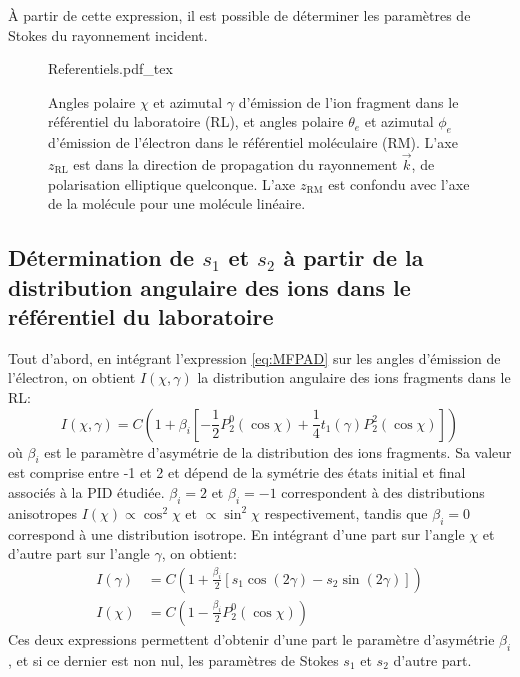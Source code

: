 \`{A} partir de cette expression, il est possible de déterminer les paramètres de Stokes du rayonnement incident.

\begin{figure}
\centering
\def\svgwidth{0.5\textwidth}
{Referentiels.pdf_tex}
\caption{Angles polaire $\chi$ et azimutal $\gamma$ d'émission de l'ion fragment dans le référentiel du laboratoire (RL), et angles polaire $\theta_e$ et azimutal $\phi_e$ d'émission de l'électron dans le référentiel moléculaire (RM). L'axe $z_{\text{RL}}$ est dans la direction de propagation du rayonnement $\vec{k}$, de polarisation elliptique quelconque. L'axe $z_{\text{RM}}$ est confondu avec l'axe de la molécule pour une molécule linéaire.}
\label{fig:Referentiels}
\end{figure}

\subsection{Détermination de $s_1$ et $s_2$ à partir de la distribution angulaire des ions dans le référentiel du laboratoire}
Tout d'abord, en intégrant l'expression \ref{eq:MFPAD} sur les angles d'émission de l'électron, on obtient $I(\chi, \gamma)$ la distribution angulaire des ions fragments dans le RL:
\begin{equation}
I(\chi, \gamma) = C \left( 1 + \beta_i \left[ - \frac{1}{2} P_2^0(\cos \chi) + \frac{1}{4} t_1(\gamma) P_2^2(\cos \chi) \right] \right)
\end{equation}
où $\beta_i$ est le paramètre d'asymétrie de la distribution des ions fragments. Sa valeur est comprise entre -1 et 2 et dépend de la symétrie des états initial et final associés à la PID étudiée. $\beta_i =2$ et $\beta_i = -1$ correspondent à des distributions anisotropes $I(\chi) \propto \cos^2 \chi$ et $\propto \sin^2 \chi$ respectivement, tandis que $\beta_i = 0$ correspond à une distribution isotrope. En intégrant d'une part sur l'angle $\chi$ et d'autre part sur l'angle $\gamma$, on obtient:
\begin{align}
I(\gamma) & = C \left( 1 + \frac{\beta_i}{2} \left[ s_1 \cos (2\gamma) - s_2 \sin (2\gamma) \right] \right) \\
I(\chi) & = C \left( 1 - \frac{\beta_i}{2} P_2^0(\cos \chi) \right)
\end{align}
Ces deux expressions permettent d'obtenir d'une part le paramètre d'asymétrie $\beta_i$, et si ce dernier est non nul, les paramètres de Stokes $s_1$ et $s_2$ d'autre part.

